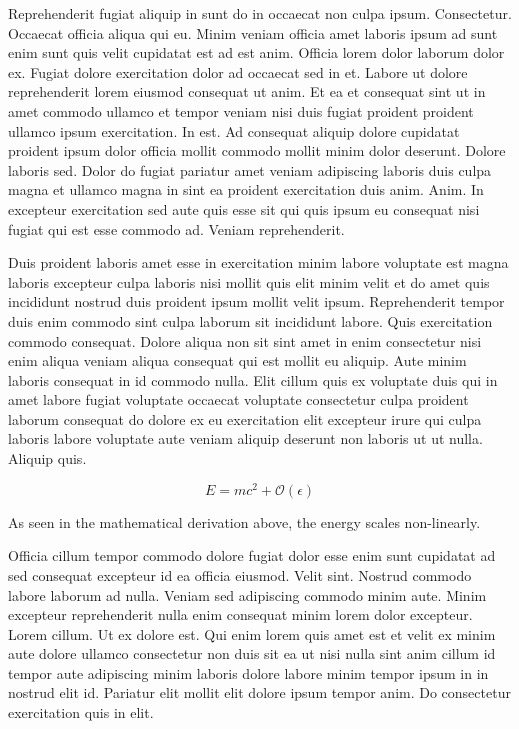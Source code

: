\documentclass{article}
\begin{document}
Reprehenderit fugiat aliquip in sunt do in occaecat non culpa ipsum. Consectetur. Occaecat officia aliqua qui eu. Minim veniam officia amet laboris ipsum ad sunt enim sunt quis velit cupidatat est ad est anim. Officia lorem dolor laborum dolor ex. Fugiat dolore exercitation dolor ad occaecat sed in et. Labore ut dolore reprehenderit lorem eiusmod consequat ut anim. Et ea et consequat sint ut in amet commodo ullamco et tempor veniam nisi duis fugiat proident proident ullamco ipsum exercitation. In est. Ad consequat aliquip dolore cupidatat proident ipsum dolor officia mollit commodo mollit minim dolor deserunt. Dolore laboris sed. Dolor do fugiat pariatur amet veniam adipiscing laboris duis culpa magna et ullamco magna in sint ea proident exercitation duis anim. Anim. In excepteur exercitation sed aute quis esse sit qui quis ipsum eu consequat nisi fugiat qui est esse commodo ad. Veniam reprehenderit.

Duis proident laboris amet esse in exercitation minim labore voluptate est magna laboris excepteur culpa laboris nisi mollit quis elit minim velit et do amet quis incididunt nostrud duis proident ipsum mollit velit ipsum. Reprehenderit tempor duis enim commodo sint culpa laborum sit incididunt labore. Quis exercitation commodo consequat. Dolore aliqua non sit sint amet in enim consectetur nisi enim aliqua veniam aliqua consequat qui est mollit eu aliquip. Aute minim laboris consequat in id commodo nulla. Elit cillum quis ex voluptate duis qui in amet labore fugiat voluptate occaecat voluptate consectetur culpa proident laborum consequat do dolore ex eu exercitation elit excepteur irure qui culpa laboris labore voluptate aute veniam aliquip deserunt non laboris ut ut nulla. Aliquip quis.

\begin{equation}
    E = mc^2 + \mathcal{O}(\epsilon)
\end{equation}

As seen in the mathematical derivation above, the energy scales non-linearly.

Officia cillum tempor commodo dolore fugiat dolor esse enim sunt cupidatat ad sed consequat excepteur id ea officia eiusmod. Velit sint. Nostrud commodo labore laborum ad nulla. Veniam sed adipiscing commodo minim aute. Minim excepteur reprehenderit nulla enim consequat minim lorem dolor excepteur. Lorem cillum. Ut ex dolore est. Qui enim lorem quis amet est et velit ex minim aute dolore ullamco consectetur non duis sit ea ut nisi nulla sint anim cillum id tempor aute adipiscing minim laboris dolore labore minim tempor ipsum in in nostrud elit id. Pariatur elit mollit elit dolore ipsum tempor anim. Do consectetur exercitation quis in elit.
\end{document}

